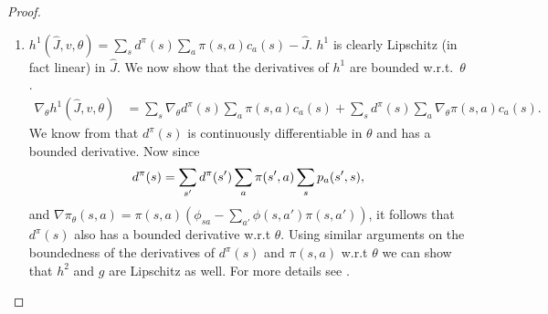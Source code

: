 \begin{proof}
\begin{enumerate}
\item $h^1(\hat{J},v,\theta)=\sum_s d^\pi(s) \sum_a \pi(s,a) c_a(s) -\hat{J}$. $h^1$ is clearly Lipschitz 
(in fact linear) in $\hat{J}$. We now show that the derivatives of $h^1$ are bounded w.r.t.~$\theta$.
\begin{align}
\nabla_\theta h^1(\hat{J},v,\theta)&=\sum_s \nabla_\theta d^\pi(s) \sum_a \pi(s,a) c_a(s)+\sum_s d^\pi(s) \sum_a \nabla_\theta \pi(s,a) c_a(s).
\end{align}
We know from \cite{PJS} that $d^\pi(s)$ is continuously differentiable in $\theta$ and has a 
bounded derivative. Now since
\begin{align}
d^\pi(s)=\sum_{s'} d^\pi(s') \sum_a \pi(s',a) \sum_{s}p_a (s',s),\nonumber
\end{align}
and $\nabla\pi_\theta(s,a)= \pi(s,a)(\phi_{sa}-\sum_{a'} \phi(s,a')\pi(s,a'))$, it follows
that $d^\pi(s)$ also has a bounded derivative w.r.t $\theta$.
Using similar arguments on the boundedness of the derivatives of $d^\pi(s)$ and $\pi(s,a)$ w.r.t $\theta$ we can show that $h^2$ and $g$ are Lipschitz as well. For more details see \cite{PJS}.


\end{enumerate}
\end{proof}
